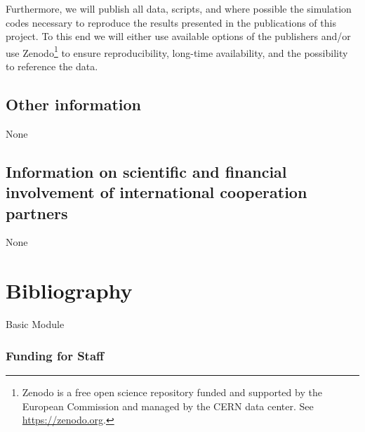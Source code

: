 \documentclass[10pt,fleqn,twoside]{article}
\begin{document}
Furthermore, we will publish all data, scripts, and where possible the
simulation codes necessary to reproduce the results presented in the
publications of this project. To this end we will either use available
options of the publishers and/or use Zenodo\footnote{Zenodo is a free
open science repository funded and supported by the European
Commission and managed by the CERN data center. See
\url{https://zenodo.org}.} to ensure reproducibility, long-time
availability, and the possibility to reference the data.



\subsection{Other information}


None

\subsection{Information on scientific and financial involvement of international cooperation partners}

None

\section{Bibliography}

\begingroup
\renewcommand{\section}[2]{}%


\endgroup

\section{Requested modules/funds}


\subsection{Basic Module}

\subsubsection{Funding for Staff}
\end{document}
